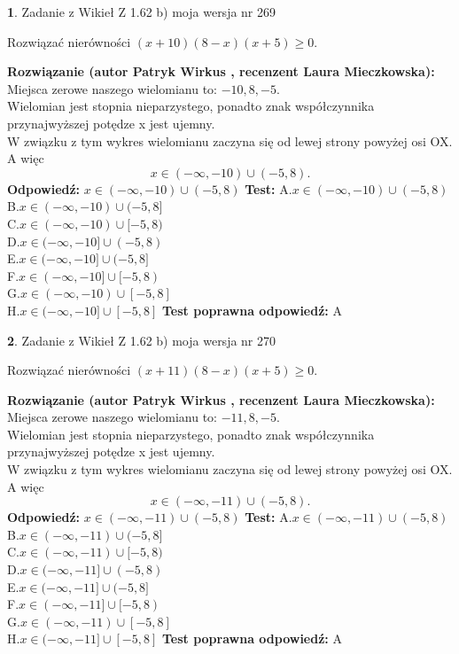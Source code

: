 \documentclass[12pt, a4paper]{article}
\theoremstyle{definition} %
\newtheorem{zad}{}
\newcommand{\zadStart}[1]{\begin{zad}#1\newline}
\newcommand{\zadStop}{\end{zad}}
\newcommand{\rozwStart}[2]{\noindent \textbf{Rozwiązanie (autor #1 , recenzent #2): }\newline}
\newcommand{\rozwStop}{\newline}
\newcommand{\odpStart}{\noindent \textbf{Odpowiedź:}\newline}
\newcommand{\odpStop}{\newline}
\newcommand{\testStart}{\noindent \textbf{Test:}\newline}
\newcommand{\testStop}{\newline}
\newcommand{\kluczStart}{\noindent \textbf{Test poprawna odpowiedź:}\newline}
\newcommand{\kluczStop}{\newline}
\begin{document}
\zadStart{Zadanie z Wikieł Z 1.62 b) moja wersja nr 269}

Rozwiązać nierówności $(x+10)(8-x)(x+5)\ge0$.
\zadStop
\rozwStart{Patryk Wirkus}{Laura Mieczkowska}
Miejsca zerowe naszego wielomianu to: $-10, 8, -5$.\\
Wielomian jest stopnia nieparzystego, ponadto znak współczynnika przy\linebreak najwyższej potędze x jest ujemny.\\ W związku z tym wykres wielomianu zaczyna się od lewej strony powyżej osi OX. A więc $$x \in (-\infty,-10) \cup (-5,8).$$
\rozwStop
\odpStart
$x \in (-\infty,-10) \cup (-5,8)$
\odpStop
\testStart
A.$x \in (-\infty,-10) \cup (-5,8)$\\
B.$x \in (-\infty,-10) \cup (-5,8]$\\
C.$x \in (-\infty,-10) \cup [-5,8)$\\
D.$x \in (-\infty,-10] \cup (-5,8)$\\
E.$x \in (-\infty,-10] \cup (-5,8]$\\
F.$x \in (-\infty,-10] \cup [-5,8)$\\
G.$x \in (-\infty,-10) \cup [-5,8]$\\
H.$x \in (-\infty,-10] \cup [-5,8]$
\testStop
\kluczStart
A
\kluczStop



\zadStart{Zadanie z Wikieł Z 1.62 b) moja wersja nr 270}

Rozwiązać nierówności $(x+11)(8-x)(x+5)\ge0$.
\zadStop
\rozwStart{Patryk Wirkus}{Laura Mieczkowska}
Miejsca zerowe naszego wielomianu to: $-11, 8, -5$.\\
Wielomian jest stopnia nieparzystego, ponadto znak współczynnika przy\linebreak najwyższej potędze x jest ujemny.\\ W związku z tym wykres wielomianu zaczyna się od lewej strony powyżej osi OX. A więc $$x \in (-\infty,-11) \cup (-5,8).$$
\rozwStop
\odpStart
$x \in (-\infty,-11) \cup (-5,8)$
\odpStop
\testStart
A.$x \in (-\infty,-11) \cup (-5,8)$\\
B.$x \in (-\infty,-11) \cup (-5,8]$\\
C.$x \in (-\infty,-11) \cup [-5,8)$\\
D.$x \in (-\infty,-11] \cup (-5,8)$\\
E.$x \in (-\infty,-11] \cup (-5,8]$\\
F.$x \in (-\infty,-11] \cup [-5,8)$\\
G.$x \in (-\infty,-11) \cup [-5,8]$\\
H.$x \in (-\infty,-11] \cup [-5,8]$
\testStop
\kluczStart
A
\kluczStop
\end{document}
